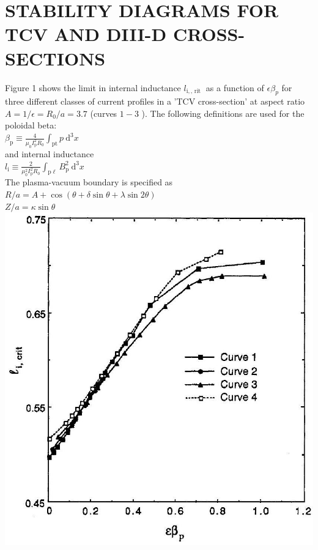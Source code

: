\documentclass[10pt]{article}
\begin{document}
\section{STABILITY DIAGRAMS FOR TCV AND DIII-D CROSS-SECTIONS}
Figure 1 shows the limit in internal inductance $l_{\mathrm{i}, \text {, rit }}$ as a function of $\epsilon \beta_{p}$ for three different classes of current profiles in a 'TCV cross-section' at aspect ratio $A=1 / \epsilon=R_{0} / a=3.7$ (curves $1-3$ ). The following definitions are used for the poloidal beta:\\
$\beta_{\mathrm{p}} \equiv \frac{4}{\mu_{0} I_{\mathrm{p}}^{2} R_{0}} \int_{\mathrm{pt}} p \mathrm{~d}^{3} x$\\
and internal inductance\\
$l_{\mathrm{i}} \equiv \frac{2}{\mu_{0}^{2} I_{\mathrm{p}}^{2} R_{0}} \int_{\mathrm{p} \ell} B_{\mathrm{p}}^{2} \mathrm{~d}^{3} x$\\
The plasma-vacuum boundary is specified as\\
$R / a=A+\cos (\theta+\delta \sin \theta+\lambda \sin 2 \theta)$\\
$Z / a=\kappa \sin \theta$\\
\includegraphics[max width=\textwidth, center]{2025_01_10_a0135324997886412d98g-3}
\end{document}
